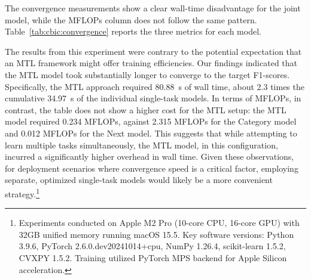 The convergence measurements show a clear wall-time disadvantage for the joint model, while the MFLOPs column does not follow the same pattern. Table~\ref{tab:cbic:convergence} reports the three metrics for each model.



The results from this experiment were contrary to the potential expectation that an MTL framework might offer training efficiencies. Our findings indicated that the MTL model took substantially longer to converge to the target F1-scores. Specifically, the MTL approach required 80.88~s of wall time, about 2.3 times the cumulative 34.97~s of the individual single-task models. In terms of MFLOPs, in contrast, the table does not show a higher cost for the MTL setup: the MTL model required 0.234 MFLOPs, against 2.315 MFLOPs for the Category model and 0.012 MFLOPs for the Next model. This suggests that while attempting to learn multiple tasks simultaneously, the MTL model, in this configuration, incurred a significantly higher overhead in wall time. Given these observations, for deployment scenarios where convergence speed is a critical factor, employing separate, optimized single-task models would likely be a more convenient strategy.\footnote{Experiments conducted on Apple M2 Pro (10-core CPU, 16-core GPU) with 32GB unified memory running macOS 15.5. Key software versions: Python 3.9.6, PyTorch 2.6.0.dev20241014+cpu, NumPy 1.26.4, scikit-learn 1.5.2, CVXPY 1.5.2. Training utilized PyTorch MPS backend for Apple Silicon acceleration.}
